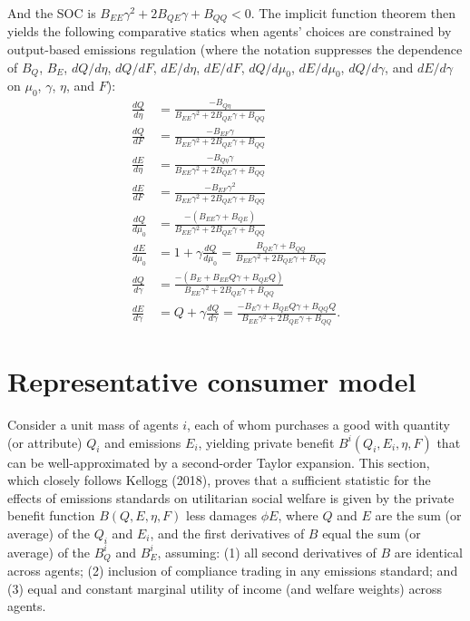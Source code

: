 \documentclass[12pt]{article}
\begin{document}
And the SOC is $B_{EE}\gamma^2+2B_{QE}\gamma+B_{QQ}<0$. The implicit function theorem then yields the following comparative statics when agents' choices are constrained by output-based emissions regulation (where the notation suppresses the dependence of $B_Q$, $B_E$, $dQ/d\eta$, $dQ/dF$, $dE/d\eta$, $dE/dF$, $dQ/d\mu_0$, $dE/d\mu_0$, $dQ/d\gamma$, and $dE/d\gamma$ on $\mu_0$, $\gamma$, $\eta$, and $F$):
\begin{align}
\frac{dQ}{d\eta}&=\frac{-B_{Q\eta}}{B_{EE}\gamma^2+2B_{QE}\gamma+B_{QQ}} \label{eq:A1_dQdeta_c} \\
\frac{dQ}{dF}&=\frac{-B_{EF}\gamma}{B_{EE}\gamma^2+2B_{QE}\gamma+B_{QQ}} \label{eq:A1_dQdF_c} \\
\frac{dE}{d\eta}&=\frac{-B_{Q\eta}\gamma}{B_{EE}\gamma^2+2B_{QE}\gamma+B_{QQ}} \label{eq:A1_dEdeta_c} \\
\frac{dE}{dF}&=\frac{-B_{EF}\gamma^2}{B_{EE}\gamma^2+2B_{QE}\gamma+B_{QQ}} \label{eq:A1_dEdF_c} \\
\frac{dQ}{d\mu_0} &= \frac{-(B_{EE}\gamma+B_{QE})}{B_{EE}\gamma^2+2B_{QE}\gamma+B_{QQ}} \label{eq:A1_dQdu} \\
\frac{dE}{d\mu_0} &= 1+\gamma\frac{dQ}{d\mu_0}=\frac{B_{QE}\gamma+B_{QQ}}{B_{EE}\gamma^2+2B_{QE}\gamma+B_{QQ}} \label{eq:A1_dEdu} \\
\frac{dQ}{d\gamma} &= \frac{-(B_E+B_{EE}Q\gamma+B_{QE}Q)}{B_{EE}\gamma^2+2B_{QE}\gamma+B_{QQ}} \label{eq:A1_dQdgamma} \\
\frac{dE}{d\gamma} &= Q+\gamma\frac{dQ}{d\gamma}=\frac{-B_E\gamma+B_{QE}Q\gamma+B_{QQ}Q}{B_{EE}\gamma^2+2B_{QE}\gamma+B_{QQ}}. \label{eq:A1_dEdgamma}
\end{align}



\section{Representative consumer model \label{appx:Aggregation}}

Consider a unit mass of agents $i$, each of whom purchases a good with quantity (or attribute) $Q_i$ and emissions $E_i$, yielding private benefit $B^i(Q_i,E_i,\eta,F)$ that can be well-approximated by a second-order Taylor expansion. This section, which closely follows Kellogg (2018), proves that a sufficient statistic for the effects of emissions standards on utilitarian social welfare is given by the private benefit function $B(Q,E,\eta,F)$ less damages $\phi E$, where $Q$ and $E$ are the sum (or average) of the $Q_i$ and $E_i$, and the first derivatives of $B$ equal the sum (or average) of the $B^i_Q$ and $B^i_E$, assuming: (1) all second derivatives of $B$ are identical across agents; (2) inclusion of compliance trading in any emissions standard; and (3) equal and constant marginal utility of income (and welfare weights) across agents.
\end{document}
